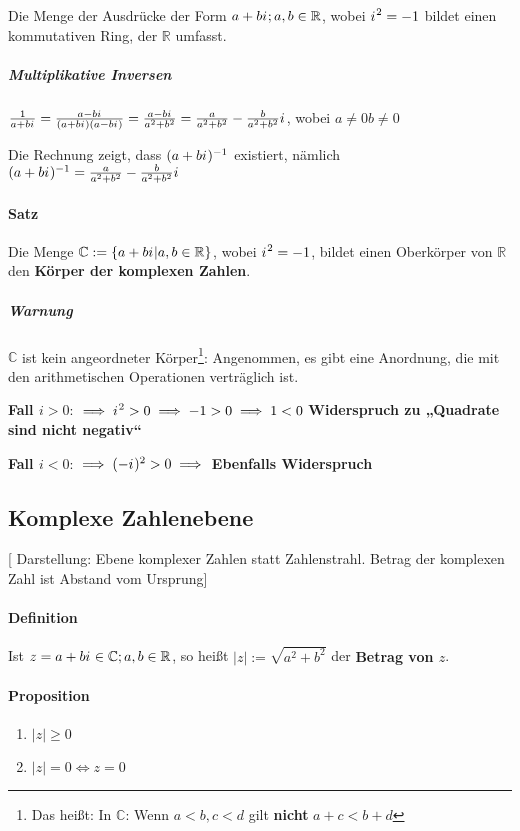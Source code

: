 \documentclass[14pt,a4paper]{article}
\newcommand{\R}{\ensuremath{\mathbb{R}}}
\newcommand{\C}{\ensuremath{\mathbb{C}}}
\newcommand{\iu}{{i\mkern1mu}}
\begin{document}
  Die Menge der Ausdrücke der Form $a + b \iu ; a,b \in \R$, wobei $\iu^2 = -1$
  bildet einen kommutativen Ring, der $\R$ umfasst.

  \subparagraph{Multiplikative Inversen}
  $\frac{1}{a+b \iu} = \frac{a - b \iu}{(a + b \iu)(a -b \iu)} = \frac{a-b \iu
  }{a^2+b^2} = \frac{a}{a^2 + b^2} - \frac{b}{a^2 + b^2} \iu$,
   wobei $a \neq 0  b \neq 0$

  Die Rechnung zeigt, dass $(a+b \iu)^{-1}$ existiert, nämlich $(a + b\iu)^{-1}
  = \frac{a}{a^2 + b^2} - \frac{b}{a^2 + b^2}\iu$

  \paragraph{Satz}
  Die Menge $\C := \{ a + b \iu | a,b \in \R \}$, wobei $ \iu^2 = -1 $, bildet einen Oberkörper von
  $\R$ den \textbf{Körper der komplexen Zahlen}.

  \subparagraph{Warnung}
  $\C$ ist kein angeordneter Körper\footnote{Das heißt: In $\C$: Wenn $a < b, c
    <d$ gilt \textbf{nicht} $a + c < b + d$}:
  Angenommen, es gibt eine Anordnung, die mit den arithmetischen Operationen
  verträglich ist.

  \textbf{Fall $i > 0$}: $\implies \iu^2 > 0 \implies -1 > 0 \implies 1 < 0$
  \textbf{Widerspruch zu „Quadrate sind nicht negativ“}
  
  \textbf{Fall $i < 0$}: $\implies (- \iu)^2 > 0 \implies $
  \textbf{Ebenfalls Widerspruch}

  \subsection{Komplexe Zahlenebene}
  [ Darstellung: Ebene komplexer Zahlen statt Zahlenstrahl. Betrag der komplexen
  Zahl ist Abstand vom Ursprung]

  \paragraph{Definition}
  Ist $ z = a + b \iu \in \C ; a,b \in \R$, so heißt $ |z| := \sqrt{a^2 + b^2}$
  der \textbf{Betrag von $z$}.

  \paragraph{Proposition}
  \begin{enumerate}
  \item $|z| \geq 0$
  \item $|z| = 0 \Leftrightarrow z = 0$
  \end{enumerate}
\end{document}
